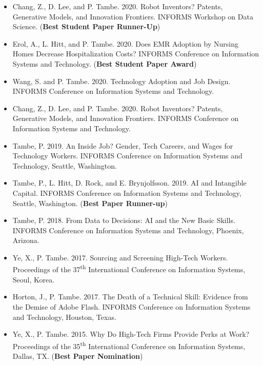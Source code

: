 \documentclass[10pt,letterpaper]{article}
\begin{document}
\begin{itemize}
\item Chang, Z., D. Lee, and P. Tambe. 2020. Robot Inventors? Patents, Generative Models, and Innovation Frontiers. INFORMS Workshop on Data Science. (\textbf{Best Student Paper Runner-Up})

\item Erol, A., L. Hitt, and P. Tambe. 2020. Does EMR Adoption by Nursing Homes Decrease Hospitalization Costs? INFORMS Conference on Information Systems and Technology. (\textbf{Best Student Paper Award})

\item Wang, S. and P. Tambe. 2020. Technology Adoption and Job Design. INFORMS Conference on Information Systems and Technology. 

\item Chang, Z., D. Lee, and P. Tambe. 2020. Robot Inventors? Patents, Generative Models, and Innovation Frontiers. INFORMS Conference on Information Systems and Technology. 

\item Tambe, P. 2019. An Inside Job? Gender, Tech Careers, and Wages for Technology Workers. INFORMS Conference on Information Systems and Technology, Seattle, Washington. 

\item Tambe, P., L. Hitt, D. Rock, and E. Brynjolfsson. 2019. AI and Intangible Capital. INFORMS Conference on Information Systems and Technology, Seattle, Washington. (\textbf{Best Paper Runner-up})

\item Tambe, P. 2018. From Data to Decisions: AI and the New Basic Skills. INFORMS Conference on Information Systems and Technology, Phoenix, Arizona. 

\item Ye, X., P. Tambe. 2017. Sourcing and Screening High-Tech Workers. Proceedings of the 37\textsuperscript{th} International Conference on Information Systems, Seoul, Korea. 

\item Horton, J., P. Tambe. 2017. The Death of a Technical Skill: Evidence from the Demise of Adobe Flash.  INFORMS Conference on Information Systems and Technology, Houston, Texas.
  
\item Ye, X., P. Tambe. 2015. Why Do High-Tech Firms Provide Perks at Work? Proceedings of the 35\textsuperscript{th} International Conference on Information Systems, Dallas, TX. (\textbf{Best Paper Nomination})


\end{itemize}
\end{document}
